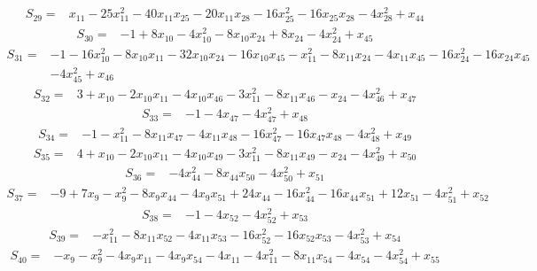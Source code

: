 \begin{align*}
S_{29}={}&x_{11}-25x_{11}^{2}-40x_{11}x_{25}-20x_{11}x_{28}-16x_{25}^{2}-16x_{25}x_{28}-4x_{28}^{2}+x_{44}
\end{align*}
\begin{align*}
S_{30}={}&-1+8x_{10}-4x_{10}^{2}-8x_{10}x_{24}+8x_{24}-4x_{24}^{2}+x_{45}
\end{align*}
\begin{align*}
S_{31}={}&-1-16x_{10}^{2}-8x_{10}x_{11}-32x_{10}x_{24}-16x_{10}x_{45}-x_{11}^{2}-8x_{11}x_{24}-4x_{11}x_{45}-16x_{24}^{2}-16x_{24}x_{45}\\
{}&-4x_{45}^{2}+x_{46}
\end{align*}
\begin{align*}
S_{32}={}&3+x_{10}-2x_{10}x_{11}-4x_{10}x_{46}-3x_{11}^{2}-8x_{11}x_{46}-x_{24}-4x_{46}^{2}+x_{47}
\end{align*}
\begin{align*}
S_{33}={}&-1-4x_{47}-4x_{47}^{2}+x_{48}
\end{align*}
\begin{align*}
S_{34}={}&-1-x_{11}^{2}-8x_{11}x_{47}-4x_{11}x_{48}-16x_{47}^{2}-16x_{47}x_{48}-4x_{48}^{2}+x_{49}
\end{align*}
\begin{align*}
S_{35}={}&4+x_{10}-2x_{10}x_{11}-4x_{10}x_{49}-3x_{11}^{2}-8x_{11}x_{49}-x_{24}-4x_{49}^{2}+x_{50}
\end{align*}
\begin{align*}
S_{36}={}&-4x_{44}^{2}-8x_{44}x_{50}-4x_{50}^{2}+x_{51}
\end{align*}
\begin{align*}
S_{37}={}&-9+7x_{9}-x_{9}^{2}-8x_{9}x_{44}-4x_{9}x_{51}+24x_{44}-16x_{44}^{2}-16x_{44}x_{51}+12x_{51}-4x_{51}^{2}+x_{52}
\end{align*}
\begin{align*}
S_{38}={}&-1-4x_{52}-4x_{52}^{2}+x_{53}
\end{align*}
\begin{align*}
S_{39}={}&-x_{11}^{2}-8x_{11}x_{52}-4x_{11}x_{53}-16x_{52}^{2}-16x_{52}x_{53}-4x_{53}^{2}+x_{54}
\end{align*}
\begin{align*}
S_{40}={}&-x_{9}-x_{9}^{2}-4x_{9}x_{11}-4x_{9}x_{54}-4x_{11}-4x_{11}^{2}-8x_{11}x_{54}-4x_{54}-4x_{54}^{2}+x_{55}
\end{align*}
